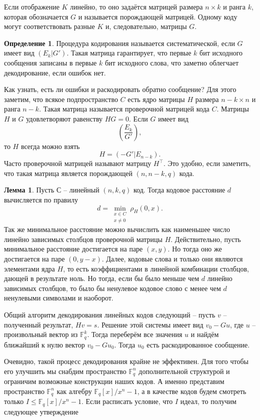 \documentclass[10pt,a4paper,oneside]{book}
\theoremstyle{definition}
\newtheorem*{defn}{{\color{yellow!30!red} Определение}}
\newtheorem{lem}{{\color{green!50!black} Лемма}}
\newcommand{\mb}[1]{\mathbb{#1}}
\def\dfn{\begin{defn}}
\def\edfn{\end{defn}}
\def\lm{\begin{lem}}
\def\elm{\end{lem}}
\begin{document}
Если отображение $K$ линейно, то оно задаётся матрицей размера $n\times k$ и ранга $k$, которая обозначается $G$ и называется порождающей матрицей. Одному коду могут соответствовать разные $K$ и, следовательно, матрицы $G$.  

\dfn Процедура кодирования называется систематической, если $G$ имеет вид $(E_k|G')$. Такая матрица гарантирует, что первые $k$ бит исходного сообщения записаны в первые $k$ бит исходного слова, что заметно облегчает декодирование, если ошибок нет.
\edfn

Как узнать, есть ли ошибки и раскодировать обратно сообщение? Для этого заметим, что всякое подпространство $C$ есть ядро матрицы $H$ размера $n-k\times n$ и ранга $n-k$. Такая матрица называется проверочной матрицей кода $C$. Матрицы $H$ и $G$ удовлетворяют равенству $HG=0$. Если $G$ имеет вид
$$\left(\frac{E_{k}}{G'}\right),$$
то $H$ всегда можно взять 
$$H=(-G'|E_{n-k}).$$
Часто проверочной матрицей называют матрицу $H^{\top}$. Это удобно, если заметить, что такая матрица является порождающей  $(n,n-k,q)$ кода.


\lm Пусть $С$ -- линейный $(n,k,q)$ код. Тогда кодовое расстояние $d$ вычисляется по правилу 
$$d=\min_{\substack{x \in C \\ x\neq 0} } \rho_H(0,x).$$
Так же минимальное расстояние можно вычислить как наименьшее число линейно зависимых столбцов проверочной матрицы $H$.
\proof
Действительно, пусть минимальное расстояние достигается на паре $(x,y)$. Но тогда оно же достигается на паре $(0,y-x)$. Далее, кодовые слова и только они являются элементами ядра $H$, то есть коэффициентами в линейной комбинации столбцов, дающей в результате ноль. Но тогда, если бы было меньше чем $d$ линейно зависимых столбцов, то было бы  ненулевое кодовое слово с менее чем $d$ ненулевыми символами и наоборот. 
\endproof
\elm



Общий алгоритм декодирования линейных кодов следующий -- пусть $v$ -- полученный результат, $Hv=s$. Решение этой системы имеет вид $v_0-Gu$, где $u$ -- произвольный вектор из $\mb F_q^k$. Тогда переберём все значения $u$ и найдём ближайший к нулю вектор $v_0-Gu_0$. Тогда $u_0$ есть раскодированное сообщение.

Очевидно, такой процесс декодирования крайне не эффективен. Для того чтобы его улучшить мы снабдим пространство $\mb F_q^n$ дополнительной структурой и ограничим возможные конструкции наших кодов. А именно представим пространство $\mb F_q^n$ как алгебру $\mb F_q[x]/x^n-1$, а в качестве кодов будем смотреть только $I \leq \mb F_q[x]/x^n-1$. Если расписать условие, что $I$ идеал, то получим следующее утверждение
\end{document}
